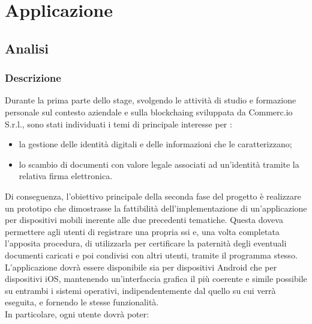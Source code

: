 
\chapter{Applicazione}
\label{cap:applicazione}

\section{Analisi}

\subsection{Descrizione}

Durante la prima parte dello stage, svolgendo le attività di studio e formazione personale sul contesto aziendale e sulla \gls{blockchaing} sviluppata da Commerc.io S.r.l., sono stati individuati i temi di principale interesse per \myCompany{} \companyTitle:

\begin{itemize}
	\item la gestione delle identità digitali e delle informazioni che le caratterizzano;
	\item lo scambio di documenti con valore legale associati ad un'identità tramite la relativa firma elettronica.
\end{itemize}
Di conseguenza, l'obiettivo principale della seconda fase del progetto è  realizzare un prototipo che dimostrasse la fattibilità dell'implementazione di un'applicazione per dispositivi mobili inerente alle due precedenti tematiche. Questa doveva permettere agli utenti di registrare una propria \gls{ssi} e, una volta completata l'apposita procedura, di utilizzarla per certificare la paternità degli eventuali documenti caricati e poi condivisi con altri utenti, tramite il programma stesso.\\
L'applicazione dovrà essere disponibile sia per dispositivi Android che per dispositivi iOS, mantenendo un'interfaccia grafica il più coerente e simile possibile su entrambi i sistemi operativi, indipendentemente dal quello su cui verrà eseguita, e fornendo le stesse funzionalità. \\
In particolare, ogni utente dovrà poter:

